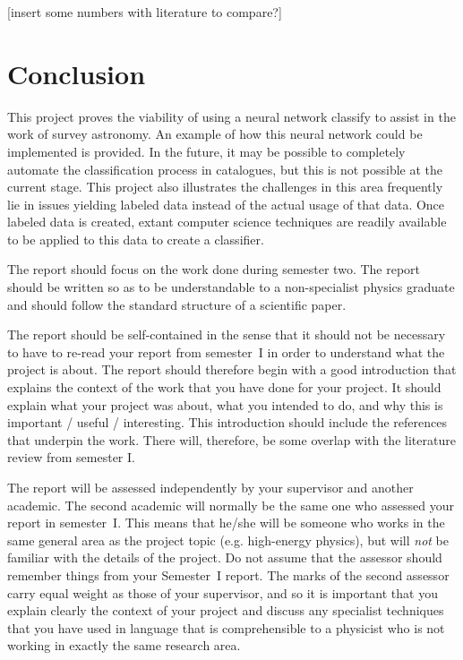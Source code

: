 \documentclass[a4paper,fleqn,usenatbib]{mnras}
\begin{document}
[insert some numbers with literature to compare?]

\section{Conclusion}
This project proves the viability of using a neural network classify to assist in the work of survey astronomy. An example of how this neural network could be implemented is provided. In the future, it may be possible to completely automate the classification process in catalogues, but this is not possible at the current stage. This project also illustrates the challenges in this area frequently lie in issues yielding labeled data instead of the actual usage of that data. Once labeled data is created, extant computer science techniques are readily available to be applied to this data to create a classifier. 

\pagebreak




The report should focus on the work done during semester two. The report should be written so as to be understandable to a non-specialist physics graduate and should follow the standard structure of a scientific paper. 

The report should be self-contained in the sense that it should not be necessary to have to re-read your report from semester~I in order to understand what the project is about. The report should therefore begin with a good introduction that explains the context of the work that you have done for your project. It should explain what your project was about, what you intended to do, and why this is important / useful / interesting. This introduction should include the references that underpin the work. There will, therefore, be some overlap with the literature review from semester I.

The report will be assessed independently by your supervisor and another academic. The second academic will normally be the same one who assessed your report in semester~I. This means that he/she will be someone who works in the same general area as the project topic (e.g. high-energy physics), but will {\em not} be familiar with the details of the project. Do not assume that the assessor should remember things from your Semester~I report. The marks of the second assessor carry equal weight as those of your supervisor, and so it is important that you explain clearly the context of your project and discuss any specialist techniques that you have used in language that is comprehensible to a physicist who is not working in exactly the same research area.
\end{document}
